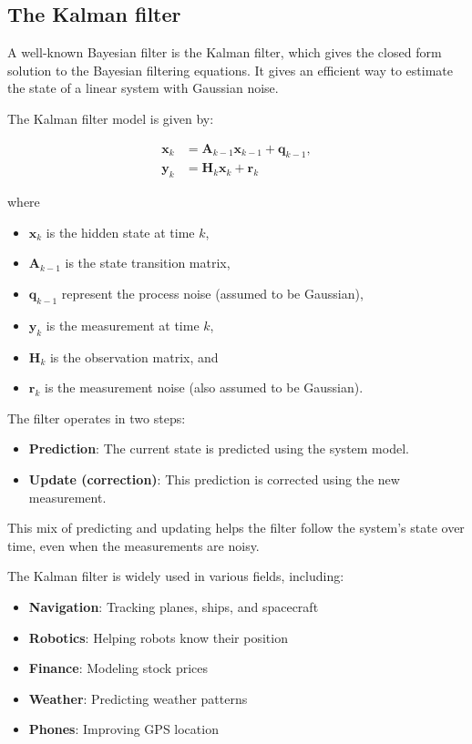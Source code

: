 \subsection{The Kalman filter}
A well-known Bayesian filter is the Kalman filter, which gives the closed form solution to the Bayesian filtering equations. It gives an efficient way to estimate the state of a linear system with Gaussian noise.

The Kalman filter model is given by:

\begin{align}\label{eq:Kalman filter}
    \mathbf{x}_k &= \mathbf{A}_{k-1}\mathbf{x}_{k-1}+\mathbf{q}_{k-1}, \nonumber\\
    \mathbf{y}_k &= \mathbf{H}_k\mathbf{x}_k+\mathbf{r}_k
\end{align}

where 
\begin{itemize}
    \item $\mathbf{x}_k$ is the hidden state at time $k$,
    \item $\mathbf{A}_{k-1}$ is the state transition matrix,
    \item $\mathbf{q}_{k-1}$ represent the process noise (assumed to be Gaussian),
    \item $\mathbf{y}_k$ is the measurement at time $k$,
    \item $\mathbf{H}_k$ is the observation matrix, and
    \item $\mathbf{r}_k$ is the measurement noise (also assumed to be Gaussian).
\end{itemize}

The filter operates in two steps:
\begin{itemize}
    \item \textbf{Prediction}: The current state is predicted using the system model.
    \item \textbf{Update (correction)}: This prediction is corrected using the new measurement.
\end{itemize}

This mix of predicting and updating helps the filter follow the system’s state over time, even when the measurements are noisy.

The Kalman filter is widely used in various fields, including:
\begin{itemize}
    \item \textbf{Navigation}: Tracking planes, ships, and spacecraft
    \item \textbf{Robotics}: Helping robots know their position
    \item \textbf{Finance}: Modeling stock prices
    \item \textbf{Weather}: Predicting weather patterns
    \item \textbf{Phones}: Improving GPS location
\end{itemize}

